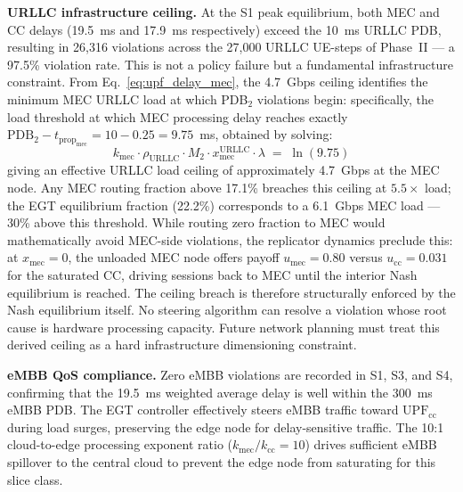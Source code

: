 \documentclass[conference]{IEEEtran}
\begin{document}
\textbf{URLLC infrastructure ceiling.}
At the S1 peak equilibrium, both MEC and CC delays
(19.5~ms and 17.9~ms respectively) exceed the 10~ms URLLC PDB,
resulting in 26,316 violations across the 27,000 URLLC UE-steps
of Phase~II --- a 97.5\% violation rate. This is not a policy
failure but a fundamental infrastructure constraint. From
Eq.~\eqref{eq:upf_delay_mec}, the 4.7~Gbps ceiling identifies
the minimum MEC URLLC load at which PDB$_2$ violations begin:
specifically, the load threshold at which MEC processing delay
reaches exactly $\text{PDB}_2 - t_{\text{prop}_\text{mec}}
= 10 - 0.25 = 9.75$~ms, obtained by solving:
\begin{equation*}
  k_\text{mec} \cdot \rho_\text{URLLC} \cdot M_2 \cdot
  x_\text{mec}^\text{URLLC} \cdot \lambda \;=\; \ln(9.75)
\end{equation*}
giving an effective URLLC load ceiling of approximately 4.7~Gbps
at the MEC node. Any MEC routing fraction above 17.1\% breaches
this ceiling at $5.5\times$ load; the EGT equilibrium fraction
(22.2\%) corresponds to a 6.1~Gbps MEC load --- 30\% above this
threshold. While routing zero fraction to MEC would mathematically
avoid MEC-side violations, the replicator dynamics preclude this:
at $x_\text{mec}=0$, the unloaded MEC node offers payoff
$u_\text{mec}=0.80$ versus $u_\text{cc}=0.031$ for the saturated
CC, driving sessions back to MEC until the interior Nash
equilibrium is reached. The ceiling breach is therefore
structurally enforced by the Nash equilibrium itself.
No steering algorithm can resolve a violation whose root cause
is hardware processing capacity. Future network planning must
treat this derived ceiling as a hard infrastructure dimensioning
constraint.

\textbf{eMBB QoS compliance.}
Zero eMBB violations are recorded in S1, S3, and S4, confirming
that the 19.5~ms weighted average delay is well within the
300~ms eMBB PDB. The EGT controller effectively steers eMBB
traffic toward $\text{UPF}_\text{cc}$ during load surges,
preserving the edge node for delay-sensitive traffic. The 10:1
cloud-to-edge processing exponent ratio ($k_\text{mec}/k_\text{cc}
= 10$) drives sufficient eMBB spillover to the central cloud to
prevent the edge node from saturating for this slice class.
\end{document}
